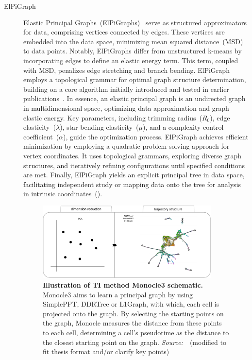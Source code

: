 \begin{description}
  \item[ElPiGraph]
  Elastic Principal Graphs~(ElPiGraphs)~\citep{albergante2020ElPiGraph} serve as structured approximators for data, comprising vertices connected by edges. These vertices are embedded into the data space, minimizing mean squared distance~(MSD) to data points. Notably, ElPiGraphs differ from unstructured k-means by incorporating edges to define an elastic energy term. This term, coupled with MSD, penalizes edge stretching and branch bending. ElPiGraph employs a topological grammar for optimal graph structure determination, building on a core algorithm initially introduced and tested in earlier publications~\citep{gorban2007topological}. In essence, an elastic principal graph is an undirected graph in multidimensional space, optimizing data approximation and graph elastic energy. Key parameters, including trimming radius~($R_0$), edge elasticity~($\lambda$), star bending elasticity~($\mu$), and a complexity control coefficient~($\alpha$), guide the optimization process. ElPiGraph achieves efficient minimization by employing a quadratic problem-solving approach for vertex coordinates. It uses topological grammars, exploring diverse graph structures, and iteratively refining configurations until specified conditions are met. Finally, ElPiGraph yields an explicit principal tree in data space, facilitating independent study or mapping data onto the tree for analysis in intrinsic coordinates~().


\begin{figure}[h!]
  	\centering
  	\includegraphics[width=0.90\textwidth]{TI_Alg_Monocle3/fig}
  	\vspace{0.1cm}
  	\caption[Illustration of TI method Monocle3 schematic.]{\textbf{Illustration of TI method Monocle3 schematic.} Monocle3 aims to learn a principal graph by using SimplePPT, DDRTree or L1Graph, with which, each cell is projected onto the graph. By selecting the starting points on the graph, Monocle measures the distance from these points to each cell, determining a cell's pseudotime as the distance to the closest starting point on the graph. \emph{Source:~\cite{cao2019monocle3}}~(modified to fit thesis format and/or clarify key points)
  	}
  	\label{fig:TI_Alg_Monocle3}
\end{figure}


\end{description}
